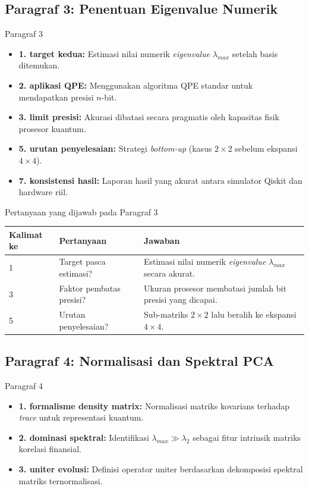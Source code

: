 \subsection{Paragraf 3: Penentuan Eigenvalue Numerik}
\begin{frame}{Paragraf 3}
    \begin{itemize}
        \item \textbf{1. target kedua:} Estimasi nilai numerik \textit{eigenvalue} $\lambda_{max}$ setelah basis ditemukan.
        \item \textbf{2. aplikasi QPE:} Menggunakan algoritma QPE standar untuk mendapatkan presisi $n$-bit.
        \item \textbf{3. limit presisi:} Akurasi dibatasi secara pragmatis oleh kapasitas fisik prosesor kuantum.
        \item \textbf{5. urutan penyelesaian:} Strategi \textit{bottom-up} (kasus $2 \times 2$ sebelum ekspansi $4 \times 4$).
        \item \textbf{7. konsistensi hasil:} Laporan hasil yang akurat antara simulator Qiskit dan hardware riil.
    \end{itemize}
\end{frame}

\begin{frame}{Pertanyaan yang dijawab pada Paragraf 3}
    \centering
    \small
    \begin{tabular}{lp{4.5cm}p{6cm}}
        \toprule
        Kalimat ke & Pertanyaan & Jawaban \\
        \midrule
        1 & Target pasca estimasi? & Estimasi nilai numerik \textit{eigenvalue} $\lambda_{max}$ secara akurat. \\
        3 & Faktor pembatas presisi? & Ukuran prosesor membatasi jumlah bit presisi yang dicapai. \\
        5 & Urutan penyelesaian? & Sub-matriks $2 \times 2$ lalu beralih ke ekspansi $4 \times 4$. \\
        \bottomrule
    \end{tabular}
\end{frame}

\subsection{Paragraf 4: Normalisasi dan Spektral PCA}
\begin{frame}{Paragraf 4}
    \begin{itemize}
        \item \textbf{1. formalisme density matrix:} Normalisasi matriks kovarians terhadap \textit{trace} untuk representasi kuantum.
        \item \textbf{2. dominasi spektral:} Identifikasi $\lambda_{max} \gg \lambda_2$ sebagai fitur intrinsik matriks korelasi finansial.
        \item \textbf{3. uniter evolusi:} Definisi operator uniter berdasarkan dekomposisi spektral matriks ternormalisasi.
    \end{itemize}
\end{frame}

